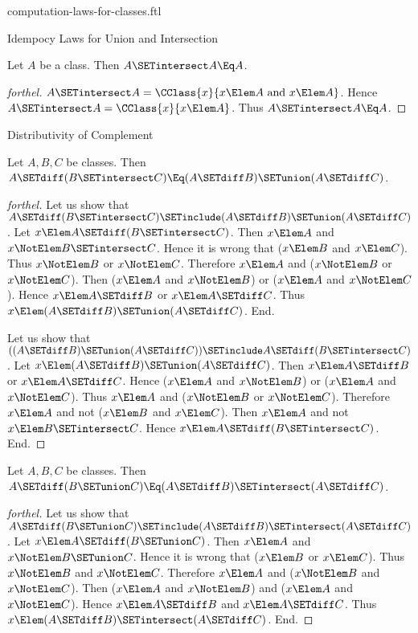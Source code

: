 \documentclass{stex}
\begin{document}
\begin{smodule}{computation-laws-for-classes.ftl}
\begin{sfragment}{Idempocy Laws for Union and Intersection}
  \begin{proposition}[forthel]
    Let $A$ be a class.
    Then $A \SETintersect A \Eq A$.
  \end{proposition}
  \begin{proof}[forthel]
    $A \SETintersect A = \CClass{x}{x \Elem A\text{ and }x \Elem A}$.
    Hence $A \SETintersect A = \CClass{x}{x \Elem A}$.
    Thus $A \SETintersect A \Eq A$.
  \end{proof}
\end{sfragment}

\begin{sfragment}{Distributivity of Complement}
  \begin{proposition}[forthel]
    Let $A, B, C$ be classes.
    Then $A \SETdiff (B \SETintersect C) \Eq (A \SETdiff B) \SETunion (A \SETdiff C)$.
  \end{proposition}
  \begin{proof}[forthel]
    Let us show that $A \SETdiff (B \SETintersect C) \SETinclude (A \SETdiff B) \SETunion (A \SETdiff C)$.
      Let $x \Elem A \SETdiff (B \SETintersect C)$.
      Then $x \Elem A$ and $x \NotElem B \SETintersect C$.
      Hence it is wrong that ($x \Elem B$ and $x \Elem C$).
      Thus $x \NotElem B$ or $x \NotElem C$.
      Therefore $x \Elem A$ and ($x \NotElem B$ or $x \NotElem C$).
      Then ($x \Elem A$ and $x \NotElem B$) or ($x \Elem A$ and $x \NotElem C$).
      Hence $x \Elem A \SETdiff B$ or $x \Elem A \SETdiff C$.
      Thus $x \Elem (A \SETdiff B) \SETunion (A \SETdiff C)$.
    End.

    Let us show that $((A \SETdiff B) \SETunion (A \SETdiff C)) \SETinclude A \SETdiff (B \SETintersect C)$. %
      Let $x \Elem (A \SETdiff B) \SETunion (A \SETdiff C)$.
      Then $x \Elem A \SETdiff B$ or $x \Elem A \SETdiff C$.
      Hence ($x \Elem A$ and $x \NotElem B$) or ($x \Elem A$ and $x \NotElem C$).
      Thus $x \Elem A$ and ($x \NotElem B$ or $x \NotElem C$).
      Therefore $x \Elem A$ and not ($x \Elem B$ and $x \Elem C$).
      Then $x \Elem A$ and not $x \Elem B \SETintersect C$.
      Hence $x \Elem A \SETdiff (B \SETintersect C)$.
    End.
  \end{proof}

  \begin{proposition}[forthel]
    Let $A, B, C$ be classes.
    Then $A \SETdiff (B \SETunion C) \Eq (A \SETdiff B) \SETintersect (A \SETdiff C)$.
  \end{proposition}
  \begin{proof}[forthel]
    Let us show that $A \SETdiff (B \SETunion C) \SETinclude (A \SETdiff B) \SETintersect (A \SETdiff C)$.
      Let $x \Elem A \SETdiff (B \SETunion C)$.
      Then $x \Elem A$ and $x \NotElem B \SETunion C$.
      Hence it is wrong that ($x \Elem B$ or $x \Elem C$).
      Thus $x \NotElem B$ and $x \NotElem C$.
      Therefore $x \Elem A$ and ($x \NotElem B$ and $x \NotElem C$).
      Then ($x \Elem A$ and $x \NotElem B$) and ($x \Elem A$ and $x \NotElem C$).
      Hence $x \Elem A \SETdiff B$ and $x \Elem A \SETdiff C$.
      Thus $x \Elem (A \SETdiff B) \SETintersect (A \SETdiff C)$.
    End.


\end{proof}
\end{sfragment}
\end{smodule}
\end{document}
